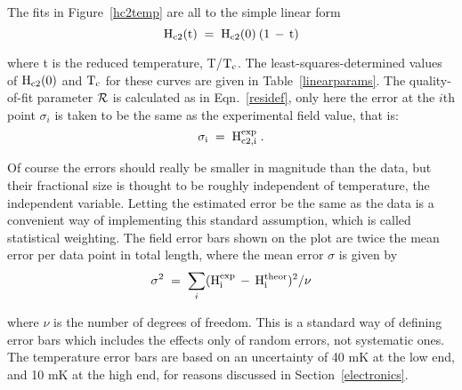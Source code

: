         The fits in Figure~\ref{hc2temp} are all to the simple linear form\\

\begin{equation}
\label{eqn:linear}
\rm H_{c2}(t) \; = \; H_{c2}(0) \: (1 \, - \, t)
\end{equation}

\noindent where     t   is      the   reduced    temperature,   T/$\rm    T_c$.   The
least-squares-determined values of $\rm H_{c2}(0)$  and $\rm T_c$ for these
curves are given in Table~\ref{linearparams}.  The quality-of-fit parameter
$\cal R$ is calculated as in Eqn.~\ref{residef}, only here the error at the
$i$th point  $\sigma_i$ is  taken to be the same  as the experimental field
value, that is:\\

\[ \rm \sigma_i \; = \; H_{c2,i}^{exp} \; .
\]

\noindent  Of course the errors should really be smaller in magnitude than the 
data, but their  fractional size is thought to  be  roughly independent  of
temperature, the independent variable.  Letting the estimated error  be the
same  as the  data  is a   convenient  way of  implementing  this  standard
assumption,   which is called  statistical weighting.\cite{bevington69} The
field error bars shown on the plot are twice  the mean error per data point
in total length, where the mean error $\sigma$ is given by\\

\[ \sigma^2 \; = \; \sum_i \rm (H_i^{exp} \, - \, H_i^{theor})^2 / \nu
\]

\noindent where $\nu$ is the number of degrees of freedom.  This is a
standard way of defining error bars\cite{pugh66} which includes the effects
only of random errors, not systematic ones. The temperature  error bars are
based on an uncertainty of 40 mK at the low end, and 10 mK at the high end,
for reasons discussed in Section~\ref{electronics}.

